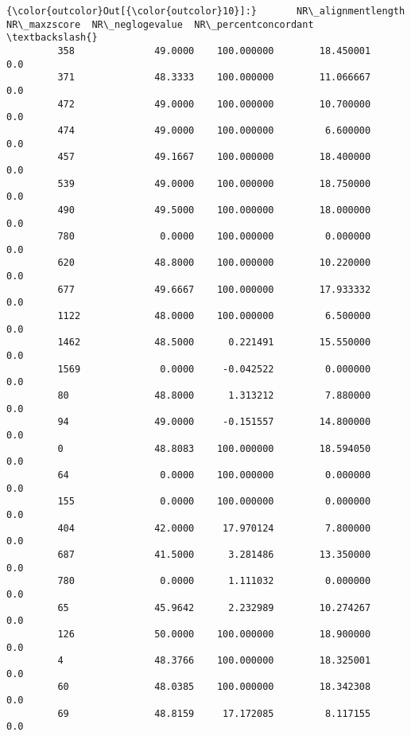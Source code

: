 \documentclass[11pt]{article}
\begin{document}
\begin{Verbatim}[commandchars=\\\{\}]
{\color{outcolor}Out[{\color{outcolor}10}]:}       NR\_alignmentlength  NR\_maxzscore  NR\_neglogevalue  NR\_percentconcordant  \textbackslash{}
         358              49.0000    100.000000        18.450001                   0.0   
         371              48.3333    100.000000        11.066667                   0.0   
         472              49.0000    100.000000        10.700000                   0.0   
         474              49.0000    100.000000         6.600000                   0.0   
         457              49.1667    100.000000        18.400000                   0.0   
         539              49.0000    100.000000        18.750000                   0.0   
         490              49.5000    100.000000        18.000000                   0.0   
         780               0.0000    100.000000         0.000000                   0.0   
         620              48.8000    100.000000        10.220000                   0.0   
         677              49.6667    100.000000        17.933332                   0.0   
         1122             48.0000    100.000000         6.500000                   0.0   
         1462             48.5000      0.221491        15.550000                   0.0   
         1569              0.0000     -0.042522         0.000000                   0.0   
         80               48.8000      1.313212         7.880000                   0.0   
         94               49.0000     -0.151557        14.800000                   0.0   
         0                48.8083    100.000000        18.594050                   0.0   
         64                0.0000    100.000000         0.000000                   0.0   
         155               0.0000    100.000000         0.000000                   0.0   
         404              42.0000     17.970124         7.800000                   0.0   
         687              41.5000      3.281486        13.350000                   0.0   
         780               0.0000      1.111032         0.000000                   0.0   
         65               45.9642      2.232989        10.274267                   0.0   
         126              50.0000    100.000000        18.900000                   0.0   
         4                48.3766    100.000000        18.325001                   0.0   
         60               48.0385    100.000000        18.342308                   0.0   
         69               48.8159     17.172085         8.117155                   0.0   

\end{Verbatim}
\end{document}
